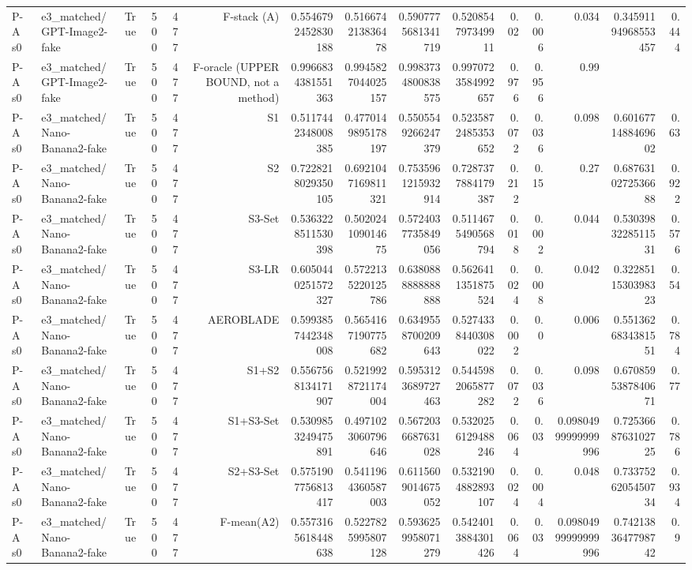 \begin{table}[htbp]
\begin{tabular}{llrrrrrrrrrrrrr}
P-A s0 & e3\_matched/GPT-Image2-fake & True & 500 & 477 & F-stack (A) & 0.5546792452830188 & 0.516674213836478 & 0.5907775681341719 & 0.520854797349911 & 0.02 & 0.006 & 0.034 & 0.34591194968553457 & 0.444 \\
P-A s0 & e3\_matched/GPT-Image2-fake & True & 500 & 477 & F-oracle (UPPER BOUND, not a method) & 0.9966834381551363 & 0.9945827044025157 & 0.9983734800838575 & 0.9970723584992657 & 0.976 & 0.956 & 0.99 &  &  \\
P-A s0 & e3\_matched/Nano-Banana2-fake & True & 500 & 477 & S1 & 0.5117442348008385 & 0.4770149895178197 & 0.5505549266247379 & 0.5235872485353652 & 0.072 & 0.036 & 0.098 & 0.6016771488469602 & 0.63 \\
P-A s0 & e3\_matched/Nano-Banana2-fake & True & 500 & 477 & S2 & 0.7228218029350105 & 0.6921047169811321 & 0.7535961215932914 & 0.7287377884179387 & 0.212 & 0.15 & 0.27 & 0.6876310272536688 & 0.922 \\
P-A s0 & e3\_matched/Nano-Banana2-fake & True & 500 & 477 & S3-Set & 0.5363228511530398 & 0.502024109014675 & 0.5724037735849056 & 0.5114675490568794 & 0.018 & 0.002 & 0.044 & 0.5303983228511531 & 0.576 \\
P-A s0 & e3\_matched/Nano-Banana2-fake & True & 500 & 477 & S3-LR & 0.6050440251572327 & 0.5722135220125786 & 0.6380888888888888 & 0.5626411351875524 & 0.024 & 0.008 & 0.042 & 0.3228511530398323 & 0.54 \\
P-A s0 & e3\_matched/Nano-Banana2-fake & True & 500 & 477 & AEROBLADE & 0.5993857442348008 & 0.5654167190775682 & 0.6349558700209643 & 0.5274338440308022 & 0.002 & 0.0 & 0.006 & 0.5513626834381551 & 0.784 \\
P-A s0 & e3\_matched/Nano-Banana2-fake & True & 500 & 477 & S1+S2 & 0.5567568134171907 & 0.5219928721174004 & 0.5953123689727463 & 0.5445982065877282 & 0.072 & 0.036 & 0.098 & 0.6708595387840671 & 0.77 \\
P-A s0 & e3\_matched/Nano-Banana2-fake & True & 500 & 477 & S1+S3-Set & 0.5309853249475891 & 0.4971023060796646 & 0.5672036687631028 & 0.5320256129488246 & 0.064 & 0.03 & 0.09804999999999996 & 0.7253668763102725 & 0.786 \\
P-A s0 & e3\_matched/Nano-Banana2-fake & True & 500 & 477 & S2+S3-Set & 0.5751907756813417 & 0.5411964360587003 & 0.6115609014675052 & 0.5321904882893107 & 0.024 & 0.004 & 0.048 & 0.7337526205450734 & 0.934 \\
P-A s0 & e3\_matched/Nano-Banana2-fake & True & 500 & 477 & F-mean(A2) & 0.5573165618448638 & 0.5227825995807128 & 0.5936259958071279 & 0.5424013884301426 & 0.064 & 0.03 & 0.09804999999999996 & 0.7421383647798742 & 0.9 \\

\end{tabular}
\end{table}
